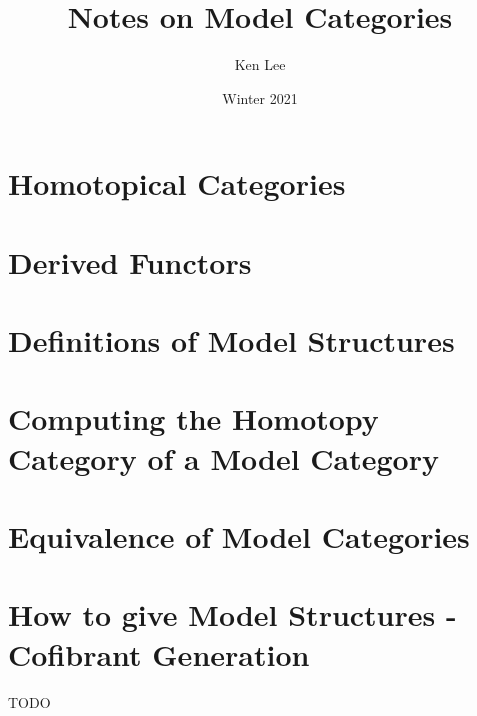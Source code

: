 \documentclass{article}
\begin{document}
\title{Notes on Model Categories}

\author{Ken Lee}
\date{Winter 2021}
\maketitle

\tableofcontents
\section{Homotopical Categories}
  
\section{Derived Functors}
  
\section{Definitions of Model Structures}
  
\section{Computing the Homotopy Category of a Model Category}
  
\section{Equivalence of Model Categories}
  
\section{How to give Model Structures - Cofibrant Generation}
  TODO
\end{document}
